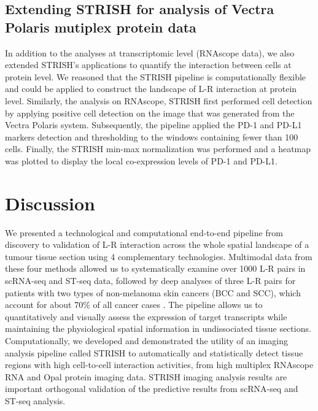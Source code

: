 \subsection{Extending STRISH for analysis of Vectra Polaris mutiplex protein data}
In addition to the analyses at transcriptomic level (RNAscope data), we also extended STRISH’s applications to quantify the interaction between cells at protein level. We reasoned that the STRISH pipeline is computationally flexible and could be applied to construct the landscape of L-R interaction at protein level. Similarly, the analysis on RNAscope, STRISH first performed cell detection by applying positive cell detection on the image that was generated from the Vectra Polaris system. Subsequently, the pipeline applied the PD-1 and PD-L1 markers detection and thresholding to the windows containing fewer than 100 cells. Finally, the STRISH min-max normalization was performed and a heatmap was plotted to display the local co-expression levels of PD-1 and PD-L1.  

\section{Discussion}
We presented a technological and computational end-to-end pipeline from discovery to validation of L-R interaction across the whole spatial landscape of a tumour tissue section using 4 complementary technologies. Multimodal data from these four methods allowed us to systematically examine over 1000 L-R pairs in scRNA-seq and ST-seq data, followed by deep analyses of three L-R pairs for patients with two types of non-melanoma skin cancers (BCC and SCC), which account for about 70\% of all cancer cases \cite{garcovich2017skin}. The pipeline allows us to quantitatively and visually assess the expression of target transcripts while maintaining the physiological spatial information in undissociated tissue sections. Computationally, we developed and demonstrated the utility of an imaging analysis pipeline called STRISH to automatically and statistically detect tissue regions with high cell-to-cell interaction activities, from high multiplex RNAscope RNA and Opal protein imaging data. STRISH imaging analysis results are important orthogonal validation of the predictive results from scRNA-seq and ST-seq analysis.  


